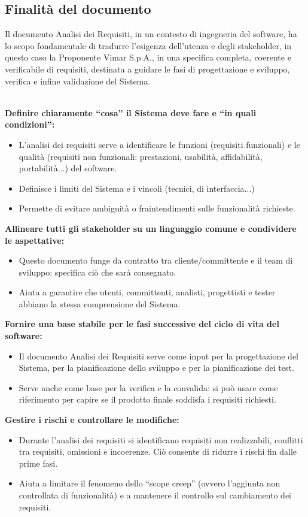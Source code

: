 \documentclass[10pt, letterpaper]{article}
\begin{document}
\subsection{Finalità del documento}{
    Il documento Analisi dei Requisiti, in un contesto di ingegneria del software, ha lo scopo fondamentale di tradurre l'esigenza dell'utenza e degli stakeholder, in questo caso la Proponente Vimar S.p.A., in una specifica completa, coerente e verificabile di requisiti, destinata a guidare le fasi di progettazione e sviluppo, verifica e infine validazione del Sistema.

    \noindent
    \\
    \textbf{Definire chiaramente “cosa” il Sistema deve fare e “in quali condizioni”:}
    \begin{itemize}
        \item L’analisi dei requisiti serve a identificare le funzioni (requisiti funzionali) e le qualità (requisiti non funzionali: prestazioni, usabilità, affidabilità, portabilità...) del software.
        \item Definisce i limiti del Sistema e i vincoli (tecnici, di interfaccia...)
        \item Permette di evitare ambiguità o fraintendimenti sulle funzionalità richieste.
    \end{itemize}

    \noindent
    \textbf{Allineare tutti gli stakeholder su un linguaggio comune e condividere le aspettative:}
    \begin{itemize}
        \item Questo documento funge da contratto tra cliente/committente e il team di sviluppo: specifica ciò che sarà consegnato.
        \item Aiuta a garantire che utenti, committenti, analisti, progettisti e tester abbiano la stessa comprensione del Sistema.
    \end{itemize}

    \noindent
    \textbf{Fornire una base stabile per le fasi successive del ciclo di vita del software:}
    \begin{itemize}
        \item Il documento Analisi dei Requisiti serve come input per la progettazione del Sistema, per la pianificazione dello sviluppo e per la pianificazione dei test.
        \item Serve anche come base per la verifica e la convalida: si può usare come riferimento per capire se il prodotto finale soddisfa i requisiti richiesti.
    \end{itemize}
    \noindent
    \textbf{Gestire i rischi e controllare le modifiche:}
    \begin{itemize}
        \item Durante l’analisi dei requisiti si identificano requisiti non realizzabili, conflitti tra requisiti, omissioni e incoerenze. Ciò consente di ridurre i rischi fin dalle prime fasi.
        \item Aiuta a limitare il fenomeno dello “scope creep” (ovvero l’aggiunta non controllata di funzionalità) e a mantenere il controllo sul cambiamento dei requisiti.
    \end{itemize}
}
\end{document}
